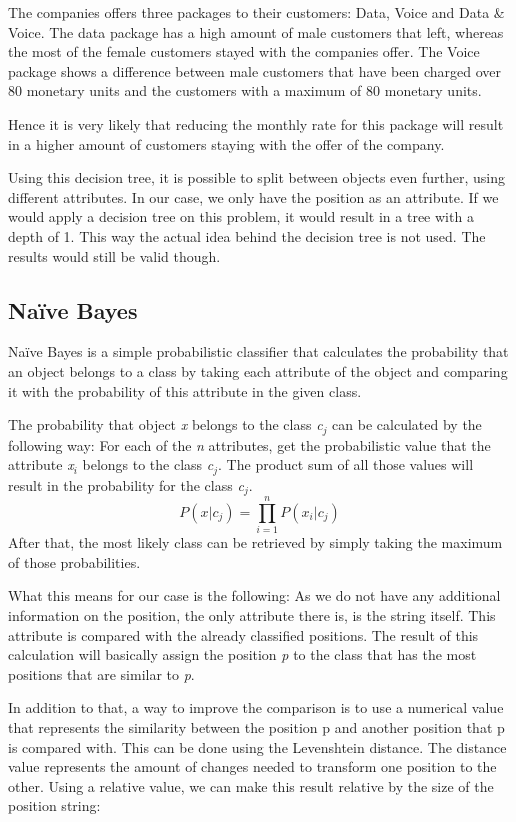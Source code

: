 The companies offers three packages to their customers: Data, Voice and Data \& Voice. The data package has a high amount of male customers that left, whereas the most of the female customers stayed with the companies offer. The Voice package shows a difference between male customers that have been charged over 80 monetary units and the customers with a maximum of 80 monetary units.

Hence it is very likely that reducing the monthly rate for this package will result in a higher amount of customers staying with the offer of the company.

Using this decision tree, it is possible to split between objects even further, using different attributes. In our case, we only have the position as an attribute. If we would apply a decision tree on this problem, it would result in a tree with a depth of 1. This way the actual idea behind the decision tree is not used. The results would still be valid though.

\subsection{Na{\"i}ve Bayes}
\label{sec4.2.3}
Na{\"i}ve Bayes is a simple probabilistic classifier that calculates the probability that an object belongs to a class by taking each attribute of the object and comparing it with the probability of this attribute in the given class.

The probability that object \emph{x} belongs to the class \emph{c$_j$} can be calculated by the following way: For each of the \emph{n} attributes, get the probabilistic value that the attribute \emph{x$_i$} belongs to the class \emph{c$_j$}. The product sum of all those values will result in the probability for the class \emph{c$_j$}.
\[
P(x|c_j) = \prod\limits_{i=1}^n P(x_i|c_j)
\]
After that, the most likely class can be retrieved by simply taking the maximum of those probabilities.

What this means for our case is the following: As we do not have any additional information on the position, the only attribute there is, is the string itself. This attribute is compared with the already classified positions. The result of this calculation will basically assign the position \emph{p} to the class that has the most positions that are similar to \emph{p}.

In addition to that, a way to improve the comparison is to use a numerical value that represents the similarity between the position p and another position that p is compared with. This can be done using the Levenshtein distance. The distance value represents the amount of changes needed to transform one position to the other. Using a relative value, we can make this result relative by the size of the position string:

